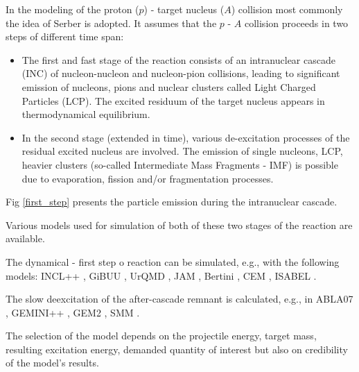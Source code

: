 In the modeling of the proton ($p$) - target nucleus ($A$) collision most commonly the idea of Serber \cite{Serber} is adopted. It assumes
that the $p$ - $A$ collision proceeds in two steps of different time span:

\begin{itemize}
	\item The first and fast stage of the reaction consists of an intranuclear cascade (INC) of nucleon-nucleon and nucleon-pion collisions, leading to significant emission of nucleons, pions and nuclear clusters called Light Charged Particles (LCP). The excited residuum of the target nucleus appears in thermodynamical equilibrium.
	\item In the second stage (extended in time), various de-excitation processes of the residual excited nucleus are involved. The emission of single nucleons, LCP, heavier clusters (so-called Intermediate Mass Fragments - IMF) is possible due to evaporation, fission and/or fragmentation processes.
\end{itemize}
Fig \ref{first_step} presents the particle emission during the intranuclear cascade.

Various models used for simulation of both of these two stages of the reaction are available.

The dynamical - first step o reaction can be  simulated, e.g., with the following models: 
INCL++  \cite{INCLCugnon1981,INCLboudard2002intranuclear,INCLboudard2004new,INCLboudard2013new,INCLMancusi2014}, 
GiBUU \cite{GiBUUBuss2012}, 
UrQMD \cite{UrQMDBASS1998,UrQMDBleicher1999}, 
JAM \cite{JAM_NARA1999}, 
Bertini \cite{Bertini1963,Bertini1969}, 
CEM \cite{CEM_GUDIMA1983}, 
ISABEL \cite{Isabel_Yariv1979,Isabel_Yariv1981}. 

The slow deexcitation of the after-cascade 
remnant is calculated, e.g., in 
ABLA07 \cite{kelic2009abla07}, 
GEMINI++ \cite{CHARITY1988,Charity2010},
GEM2 \cite{FURIHATA2000,Furihata2002},
SMM \cite{SMMBondorf1995}.

The selection of the model depends on the 
projectile energy, target mass, resulting excitation energy, demanded quantity of interest but also on credibility of the model's results.



